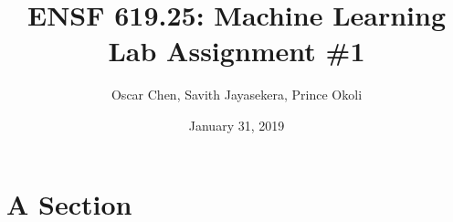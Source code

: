 \documentclass[letterpaper,12pt]{article}
\begin{document}
\title{\Large{\textbf{ENSF 619.25: Machine Learning \\ Lab Assignment \#1}}}
\author{Oscar Chen, Savith Jayasekera, Prince Okoli}
\date{January 31, 2019}
\setlength{\droptitle}{-2.5cm}
\maketitle


\section{A Section}
\blindtext[10]
\newpage
\blindtext[20]
\end{document}
